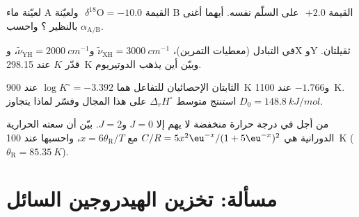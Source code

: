 \begin{exercise}[$\star\star$]\label{exo:b3:statistical-thermo-applied:9}
لعيّنة ماء A القيمة $\delta^{18}\mathrm O = -10.0$\,\textperthousand\ ولعيّنة B
القيمة $+2.0$\,\textperthousand\ على السلّم نفسه. أيهما أغنى بالنظير ؟ واحسب
 $\alpha_{\mathrm{A/B}}$.
\end{exercise}

\begin{exercise}[$\star\star\star$]\label{exo:b3:statistical-thermo-applied:10}
في التبادل  (معطيات التمرين)، $\tilde\nu_{\mathrm{XH}} =
\qty{3000}{cm^{-1}}$ و$\tilde\nu_{\mathrm{YH}} = \qty{2000}{cm^{-1}}$، وX وY ثقيلتان. قدّر $K$ عند
\qty{298.15}{K} وبيّن أين يذهب الدوتيريوم.
\end{exercise}

\begin{exercise}[$\star\star\star$]\label{exo:b3:statistical-thermo-applied:11}
الثابتان الإحصائيان للتفاعل  هما $\log K^\circ = -3.392$ عند \qty{900}{K} 
و$-1.766$ عند \qty{1100}{K}. استنتج متوسط $\Delta_rH^\circ$ على هذا المجال وفسّر
لماذا يتجاوز $D_0 = \qty{148.8}{kJ/mol}$.
\end{exercise}

\begin{exercise}[$\star\star\star$]\label{exo:b3:statistical-thermo-applied:12}
من أجل  في درجة حرارة منخفضة لا يهم إلا $J = 0$ و$J = 2$. بيّن أن
سعته الحرارية الدورانية هي $C/R = 5x^2\eu^{-x}/(1 + 5\eu^{-x})^2$ مع $x = 6\theta_{\mathrm R}/T$، 
واحسبها عند \qty{100}{K} ($\theta_{\mathrm R} = \qty{85.35}{K}$).
\end{exercise}

\section{مسألة: تخزين الهيدروجين السائل}

